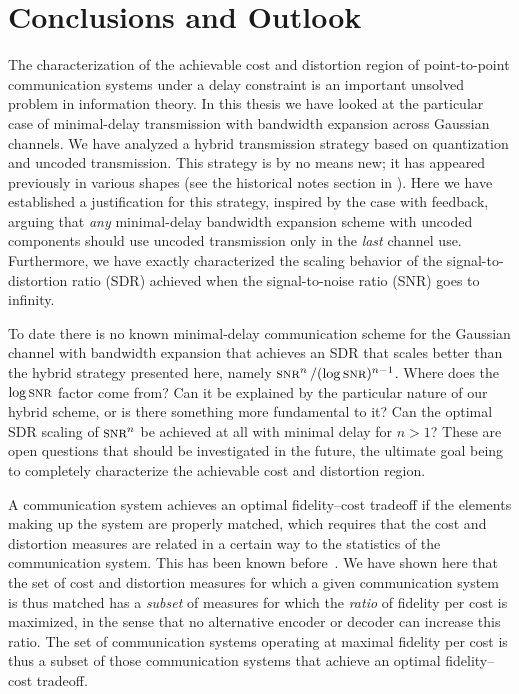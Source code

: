 \chapter{Conclusions and Outlook}\label{ch:conclusions}

The characterization of the achievable cost and distortion region of
point-to-point communication systems under a delay constraint is an important
unsolved problem in information theory. In this thesis we have looked at the
particular case of minimal-delay transmission with bandwidth expansion across
Gaussian channels. We have analyzed a hybrid transmission strategy based on
quantization and uncoded transmission. This strategy is by no means new; it has
appeared previously in various shapes (see the historical notes section in
). Here we have established a justification for this
strategy, inspired by the case with feedback, arguing that \emph{any}
minimal-delay bandwidth expansion scheme with uncoded components should use
uncoded transmission only in the \emph{last} channel use. Furthermore, we have
exactly characterized the scaling behavior of the signal-to-distortion ratio
(SDR) achieved when the signal-to-noise ratio (SNR) goes to infinity. 

To date there is no known minimal-delay communication scheme for the Gaussian
channel with bandwidth expansion that achieves an SDR that scales better than
the hybrid strategy presented here, namely $\snr^n / (\log\snr)^{n-1}$. Where
does the $\log\snr$ factor come from? Can it be explained by the particular
nature of our hybrid scheme, or is there something more fundamental to it? Can
the optimal SDR scaling of $\snr^n$ be achieved at all with minimal delay for $n
> 1$? These are open questions that should be investigated in the future, the
ultimate goal being to completely characterize the achievable cost and
distortion region. 

\medbreak

A communication system achieves an optimal fidelity--cost tradeoff if the
elements making up the system are properly matched, which requires that the cost
and distortion measures are related in a certain way to the statistics of the
communication system. This has been known before~\cite{GastparRV2003}.  We have
shown here that the set of cost and distortion measures for which a given
communication system is thus matched has a \emph{subset} of measures for which
the \emph{ratio} of fidelity per cost is maximized, in the sense that no
alternative encoder or decoder can increase this ratio. The set of communication
systems operating at maximal fidelity per cost is thus a subset of those
communication systems that achieve an optimal fidelity--cost tradeoff.

